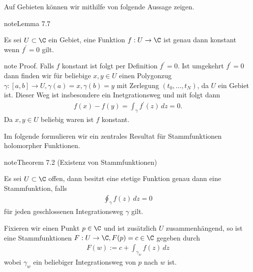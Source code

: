 \documentclass[letterpaper,10pt,german]{jupyterBook}
\begin{document}
\sphinxAtStartPar
Auf Gebieten können wir mithilfe von {\hyperref[\detokenize{complexanalysis/kurvenintegrale:lem:intdiff}]{}} folgende Aussage zeigen.
\label{complexanalysis/kurvenintegrale:lemma-15}
\begin{sphinxadmonition}{note}{Lemma 7.7}



\sphinxAtStartPar
Es sei \(U\subset\C\) ein Gebiet, eine Funktion \(f:U\to\C\) ist genau dann konstant wenn \(f^\prime=0\) gilt.
\end{sphinxadmonition}

\begin{sphinxadmonition}{note}
\sphinxAtStartPar
Proof. Falls \(f\) konstant ist folgt per Definition \(f^\prime=0\). Ist umgekehrt \(f^\prime=0\) dann finden wir für beliebige \(x,y\in U\) einen Polygonzug \(\gamma:[a,b]\to U, \gamma(a)=x,\gamma(b)=y\) mit Zerlegung \((t_0,\ldots,t_N)\), da \(U\) ein Gebiet ist. Dieser Weg ist insbesondere ein Inetgrationsweg und mit {\hyperref[\detokenize{complexanalysis/kurvenintegrale:lem:intdiff}]{}} folgt dann
\begin{equation*}
\begin{split}f(x) - f(y) = \int_\gamma f^\prime(z)\, dz = 0.\end{split}
\end{equation*}
\sphinxAtStartPar
Da \(x,y\in U\) beliebig waren ist \(f\) konstant.
\end{sphinxadmonition}

\sphinxAtStartPar
Im folgende formulieren wir ein zentrales Resultat für Stammfunktionen holomorpher Funktionen.
\label{complexanalysis/kurvenintegrale:theorem-16}
\begin{sphinxadmonition}{note}{Theorem 7.2 (Existenz von Stammfunktionen)}



\sphinxAtStartPar
Es sei \(U\subset\C\) offen, dann besitzt eine stetige Funktion genau dann eine Stammfunktion, falls
\begin{equation*}
\begin{split}\oint_\gamma f(z)\, dz =0\end{split}
\end{equation*}
\sphinxAtStartPar
für jeden geschlossenen Integrationsweg \(\gamma\) gilt.

\sphinxAtStartPar
Fixieren wir einen Punkt \(p\in\C\) und ist zusätzlich \(U\) zusammenhängend, so ist eine Stammfunktionen \(F:U\to\C, F(p)=c\in\C\) gegeben durch
\begin{equation*}
\begin{split}F(w):= c+ \int_{\gamma_w} f(z) \,dz\end{split}
\end{equation*}
\sphinxAtStartPar
wobei \(\gamma_w\) ein beliebiger Integrationsweg von \(p\) nach \(w\) ist.
\end{sphinxadmonition}
\end{document}

